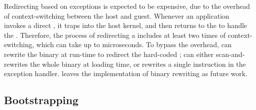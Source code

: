 Redirecting \linuxapis{} based on exceptions
is expected to be expensive,
due to the overhead of context-switching between the host and guest.
Whenever an application invokes a direct \linuxapi{},
it traps into the host kernel, and then returns to the \libos{} to handle the \linuxapi{}.
Therefore, the process of redirecting a \linuxapi{} includes at least two times of context-switching, which can take up to microseconds.
To bypass the overhead,
\thelibos{} can 
rewrite the binary at run-time to redirect the hard-coded \linuxapis{};
\thelibos{} can
either scan-and-rewrites the whole binary at loading time,
or rewrites a single  instruction in the exception handler.
\graphene{} leaves the implementation of binary rewriting
as future work.









\subsection{Bootstrapping}


\thelibos{}



